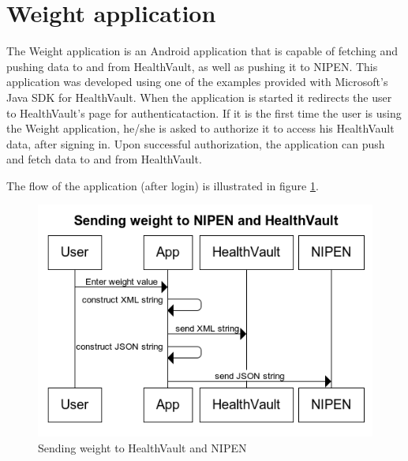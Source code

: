 \section{Weight application}

The Weight application is an Android application that is capable of fetching and pushing data
to and from HealthVault, as well as pushing it to NIPEN. This application was developed using one of the examples
provided with Microsoft's Java SDK for HealthVault\cite{HealthVaultSDK}.
When the application is started it redirects the user to HealthVault's page for authenticataction.
If it is the first time the user is using the Weight application, he/she is asked to authorize it to access
his HealthVault data, after signing in. Upon successful authorization, the application can push and fetch data
to and from HealthVault.

The flow of the application (after login) is illustrated in figure \ref{figure:sending-weight-to-healthvault-and-nipen}.

\begin{figure}[h]
\centering
\includegraphics[scale=1.0]{../Figures/sending-weight-to-healthvault-and-nipen.png}
\caption{Sending weight to HealthVault and NIPEN}
\label{figure:sending-weight-to-healthvault-and-nipen}
\end{figure}

